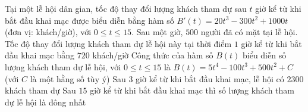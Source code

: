 \begin{ex}%
	Tại một lễ hội dân gian, tốc độ thay đổi lượng khách tham dự sau $t$ giờ kể từ khi bắt đầu khai mạc được biểu diễn bằng hàm số $B'(t) = 20t^3 - 300t^2 + 1000t$ (đơn vị: khách/giờ), với $0 \le t \le 15$. Sau một giờ, $500$ người đã có mặt tại lễ hội.
	\choiceTF
	{\True Tốc độ thay đổi lượng khách tham dự lễ hội này tại thời điểm $1$ giờ kể từ khi bắt đầu khai mạc bằng $720$ khách/giờ}
	{Công thức của hàm số $B(t)$ biểu diễn số lượng khách tham dự lễ hội, với $0 \le t \le 15$ là $B(t) = 5t^4 - 100t^3 + 500t^2 + C$ (với $C$ là một hằng số tùy ý)}
	{\True Sau $3$ giờ kể từ khi bắt đầu khai mạc, lễ hội có $2300$ khách tham dự}
	{\True Sau $15$ giờ kể từ khi bắt đầu khai mạc thì số lượng khách tham dự lễ hội là đông nhất}
\end{ex}


